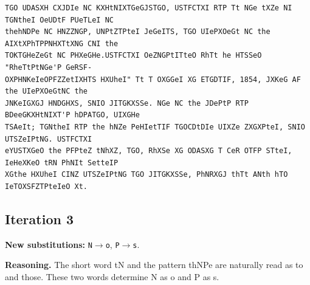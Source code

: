 \documentclass[12pt,a4paper]{article}
\begin{document}
\begin{lstlisting}[style=ciphertext,caption={Complete text after iteration 2}]
TGO UDASXH CXJDIe NC KXHtNIXTGeGJSTGO, USTFCTXI RTP Tt NGe tXZe NI TGNtheI OeUDtF PUeTLeI NC
thehNDPe NC HNZZNGP, UNPtZTPteI JeGeITS, TGO UIePXOeGt NC the AIXtXPhTPPNHXTtXNG CNI the
TOKTGHeZeGt NC PHXeGHe.USTFCTXI OeZNGPtITteO RhTt he HTSSeO "RheTtPtNGe'P GeRSF-
OXPHNKeIeOPFZZetIXHTS HXUheI" Tt T OXGGeI XG ETGDTIF, 1854, JXKeG AF the UIePXOeGtNC the
JNKeIGXGJ HNDGHXS, SNIO JITGKXSSe. NGe NC the JDePtP RTP BDeeGKXHtNIXT'P hDPATGO, UIXGHe
TSAeIt; TGNtheI RTP the hNZe PeHIetTIF TGOCDtDIe UIXZe ZXGXPteI, SNIO UTSZeIPtNG. USTFCTXI
eYUSTXGeO the PFPteZ tNhXZ, TGO, RhXSe XG ODASXG T CeR OTFP STteI, IeHeXKeO tRN PhNIt SetteIP
XGthe HXUheI CINZ UTSZeIPtNG TGO JITGKXSSe, PhNRXGJ thTt ANth hTO IeTOXSFZTPteIeO Xt.
\end{lstlisting}
\subsection{Iteration 3}

\noindent\textbf{New substitutions:} \texttt{N}$\rightarrow$\texttt{o}, \texttt{P}$\rightarrow$\texttt{s}.\par
\smallskip
\noindent\textbf{Reasoning.} The short word tN and the pattern thNPe are naturally read as to and those. These two words determine N as o and P as s.
\end{document}
